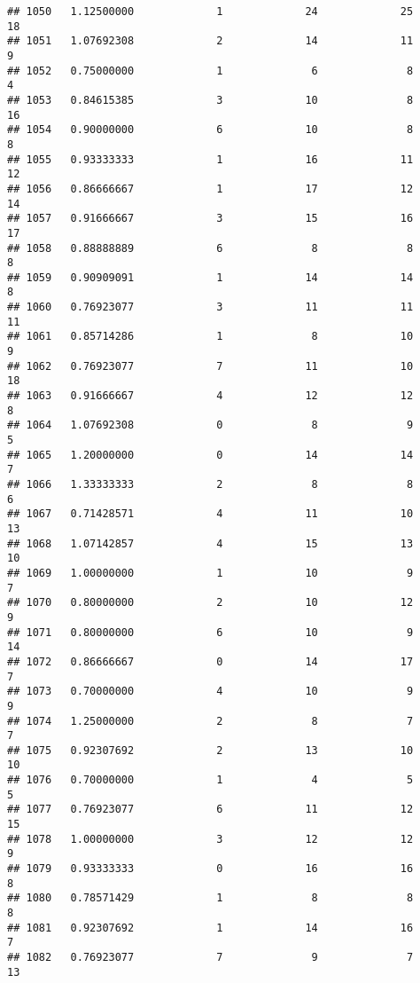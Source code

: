 \documentclass[
]{article}
\begin{document}
\begin{verbatim}
## 1050   1.12500000             1             24             25             18
## 1051   1.07692308             2             14             11              9
## 1052   0.75000000             1              6              8              4
## 1053   0.84615385             3             10              8             16
## 1054   0.90000000             6             10              8              8
## 1055   0.93333333             1             16             11             12
## 1056   0.86666667             1             17             12             14
## 1057   0.91666667             3             15             16             17
## 1058   0.88888889             6              8              8              8
## 1059   0.90909091             1             14             14              8
## 1060   0.76923077             3             11             11             11
## 1061   0.85714286             1              8             10              9
## 1062   0.76923077             7             11             10             18
## 1063   0.91666667             4             12             12              8
## 1064   1.07692308             0              8              9              5
## 1065   1.20000000             0             14             14              7
## 1066   1.33333333             2              8              8              6
## 1067   0.71428571             4             11             10             13
## 1068   1.07142857             4             15             13             10
## 1069   1.00000000             1             10              9              7
## 1070   0.80000000             2             10             12              9
## 1071   0.80000000             6             10              9             14
## 1072   0.86666667             0             14             17              7
## 1073   0.70000000             4             10              9              9
## 1074   1.25000000             2              8              7              7
## 1075   0.92307692             2             13             10             10
## 1076   0.70000000             1              4              5              5
## 1077   0.76923077             6             11             12             15
## 1078   1.00000000             3             12             12              9
## 1079   0.93333333             0             16             16              8
## 1080   0.78571429             1              8              8              8
## 1081   0.92307692             1             14             16              7
## 1082   0.76923077             7              9              7             13

\end{verbatim}
\end{document}
